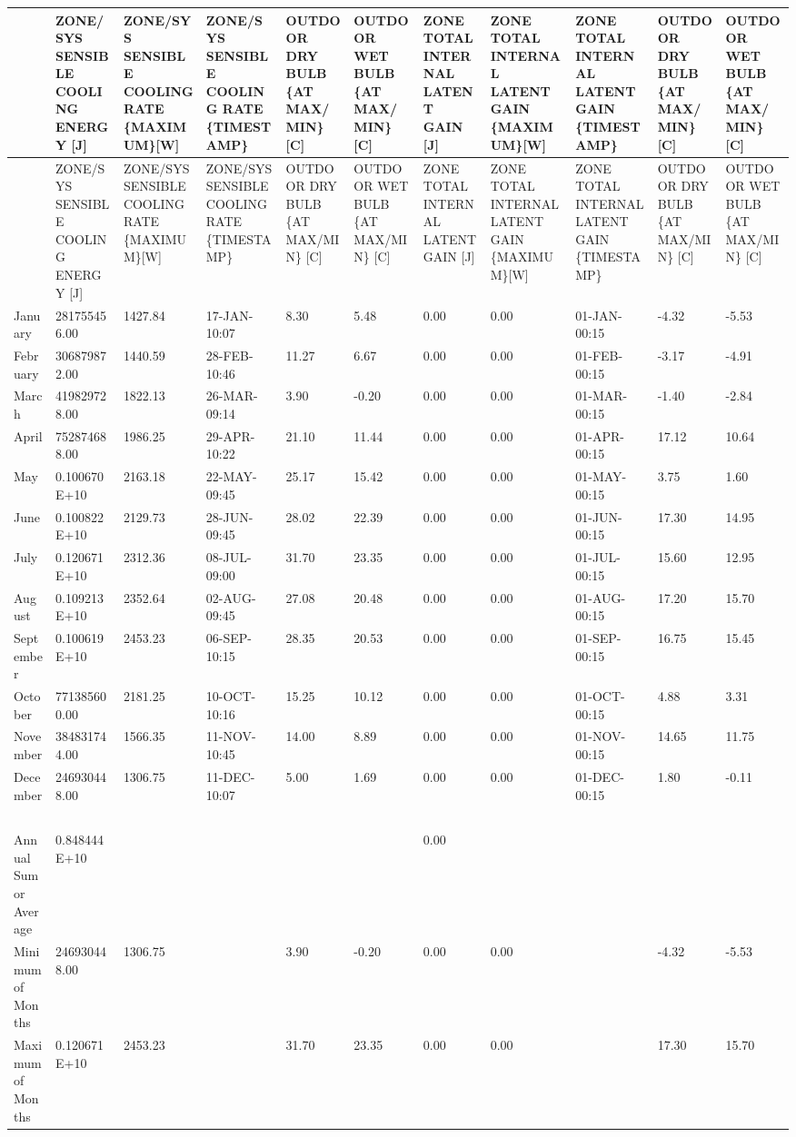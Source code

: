 {\tiny
\begin{longtable}[c]{>{\raggedright}p{0.54in}>{\raggedright}p{0.54in}>{\raggedright}p{0.54in}>{\raggedright}p{0.54in}>{\raggedright}p{0.54in}>{\raggedright}p{0.54in}>{\raggedright}p{0.54in}>{\raggedright}p{0.54in}>{\raggedright}p{0.54in}>{\raggedright}p{0.54in}>{\raggedright}p{0.54in}}
\toprule
~ & ZONE/SYS SENSIBLE COOLING ENERGY [J] & ZONE/SYS SENSIBLE COOLING RATE \{MAXIMUM\}[W] & ZONE/SYS SENSIBLE COOLING RATE \{TIMESTAMP\} & OUTDOOR DRY BULB \{AT MAX/MIN\} [C] & OUTDOOR WET BULB \{AT MAX/MIN\} [C] & ZONE TOTAL INTERNAL LATENT GAIN [J] & ZONE TOTAL INTERNAL LATENT GAIN \{MAXIMUM\}[W] & ZONE TOTAL INTERNAL LATENT GAIN \{TIMESTAMP\} & OUTDOOR DRY BULB \{AT MAX/MIN\} [C] & OUTDOOR WET BULB \{AT MAX/MIN\} [C] \tabularnewline
\midrule
\endfirsthead

\toprule
~ & ZONE/SYS SENSIBLE COOLING ENERGY [J] & ZONE/SYS SENSIBLE COOLING RATE \{MAXIMUM\}[W] & ZONE/SYS SENSIBLE COOLING RATE \{TIMESTAMP\} & OUTDOOR DRY BULB \{AT MAX/MIN\} [C] & OUTDOOR WET BULB \{AT MAX/MIN\} [C] & ZONE TOTAL INTERNAL LATENT GAIN [J] & ZONE TOTAL INTERNAL LATENT GAIN \{MAXIMUM\}[W] & ZONE TOTAL INTERNAL LATENT GAIN \{TIMESTAMP\} & OUTDOOR DRY BULB \{AT MAX/MIN\} [C] & OUTDOOR WET BULB \{AT MAX/MIN\} [C] \tabularnewline
\midrule
\endhead

January & 281755456.00 & 1427.84 & 17-JAN-10:07 & 8.30 & 5.48 & 0.00 & 0.00 & 01-JAN-00:15 & -4.32 & -5.53 \tabularnewline
February & 306879872.00 & 1440.59 & 28-FEB-10:46 & 11.27 & 6.67 & 0.00 & 0.00 & 01-FEB-00:15 & -3.17 & -4.91 \tabularnewline
March & 419829728.00 & 1822.13 & 26-MAR-09:14 & 3.90 & -0.20 & 0.00 & 0.00 & 01-MAR-00:15 & -1.40 & -2.84 \tabularnewline
April & 752874688.00 & 1986.25 & 29-APR-10:22 & 21.10 & 11.44 & 0.00 & 0.00 & 01-APR-00:15 & 17.12 & 10.64 \tabularnewline
May & 0.100670E+10 & 2163.18 & 22-MAY-09:45 & 25.17 & 15.42 & 0.00 & 0.00 & 01-MAY-00:15 & 3.75 & 1.60 \tabularnewline
June & 0.100822E+10 & 2129.73 & 28-JUN-09:45 & 28.02 & 22.39 & 0.00 & 0.00 & 01-JUN-00:15 & 17.30 & 14.95 \tabularnewline
July & 0.120671E+10 & 2312.36 & 08-JUL-09:00 & 31.70 & 23.35 & 0.00 & 0.00 & 01-JUL-00:15 & 15.60 & 12.95 \tabularnewline
August & 0.109213E+10 & 2352.64 & 02-AUG-09:45 & 27.08 & 20.48 & 0.00 & 0.00 & 01-AUG-00:15 & 17.20 & 15.70 \tabularnewline
September & 0.100619E+10 & 2453.23 & 06-SEP-10:15 & 28.35 & 20.53 & 0.00 & 0.00 & 01-SEP-00:15 & 16.75 & 15.45 \tabularnewline
October & 771385600.00 & 2181.25 & 10-OCT-10:16 & 15.25 & 10.12 & 0.00 & 0.00 & 01-OCT-00:15 & 4.88 & 3.31 \tabularnewline
November & 384831744.00 & 1566.35 & 11-NOV-10:45 & 14.00 & 8.89 & 0.00 & 0.00 & 01-NOV-00:15 & 14.65 & 11.75 \tabularnewline
December & 246930448.00 & 1306.75 & 11-DEC-10:07 & 5.00 & 1.69 & 0.00 & 0.00 & 01-DEC-00:15 & 1.80 & -0.11 \tabularnewline
~ & ~ & ~ & ~ & ~ & ~ & ~ & ~ & ~ & ~ & ~ \tabularnewline
Annual Sum or Average & 0.848444E+10 & ~ & ~ & ~ & ~ & 0.00 & ~ & ~ & ~ & ~ \tabularnewline
Minimum of Months & 246930448.00 & 1306.75 & ~ & 3.90 & -0.20 & 0.00 & 0.00 & ~ & -4.32 & -5.53 \tabularnewline
Maximum of Months & 0.120671E+10 & 2453.23 & ~ & 31.70 & 23.35 & 0.00 & 0.00 & ~ & 17.30 & 15.70 \tabularnewline
\bottomrule
\end{longtable}}

